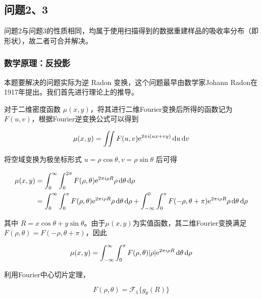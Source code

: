 \subsection{问题2、3}
问题2与问题3的性质相同，均属于使用扫描得到的数据重建样品的吸收率分布（即形状），故二者可合并解决。

\subsubsection{数学原理：反投影}
本题要解决的问题实际为逆 Radon 变换，这个问题最早由数学家Johann Radon在1917年提出\cite{radon1986}。我们首先进行理论上的推导。

对于二维密度函数 $\mu(x, y)$，将其进行二维Fourier变换后所得的函数记为 $F(u, v)$，根据Fourier逆变换公式可以得到

\begin{equation}
	\mu(x, y) = \iint F(u, v) \mathrm e^{2\pi i(ux + vy)} \mathop{}\!\mathrm{d} u \mathop{}\!\mathrm{d} v
	\label{equ:2_inv_fourier}
\end{equation}

将空域变换为极坐标形式 $u = \rho\cos\theta, v = \rho\sin\theta$ 后可得

\begin{equation}
	\begin{aligned}
	\mu(x, y) &= \int_0^\infty\int_0^{2\pi} F(\rho, \theta) \mathrm e^{2\pi i \rho R} \rho\mathop{}\!\mathrm{d} \theta \mathop{}\!\mathrm{d} \rho \\
			&= \int_0^\infty\int_0^{\pi} F(\rho, \theta) \mathrm e^{2\pi i \rho R} \rho\mathop{}\!\mathrm{d} \theta \mathop{}\!\mathrm{d} \rho
			 +\int_{-\infty}^0\int_0^{\pi} F(-\rho, \theta + \pi) \mathrm e^{2\pi i \rho R} \rho\mathop{}\!\mathrm{d} \theta \mathop{}\!\mathrm{d} \rho
	\end{aligned}
	\label{equ:2_polar_inv_fourier}
\end{equation}

其中 $R = x\cos\theta + y\sin\theta$。由于$\mu(x, y)$为实值函数，其二维Fourier变换满足$F(\rho, \theta) = F(-\rho, \theta + \pi)$，因此

\begin{equation}
	\begin{aligned}
		\mu(x, y) &= \int_{-\infty}^\infty\int_0^{\pi} F(\rho, \theta) |\rho| \mathrm e^{2\pi i \rho R} \mathop{}\!\mathrm{d} \theta \mathop{}\!\mathrm{d} \rho \\
	\end{aligned}
	\label{equ:2_polar_inv_fourier2}
\end{equation}

利用Fourier中心切片定理，

\begin{equation}
	F(\rho, \theta) = \mathcal F_1\{ g_\theta(R) \}
	\label{equ:2_fourier_center_slicing}
\end{equation}

